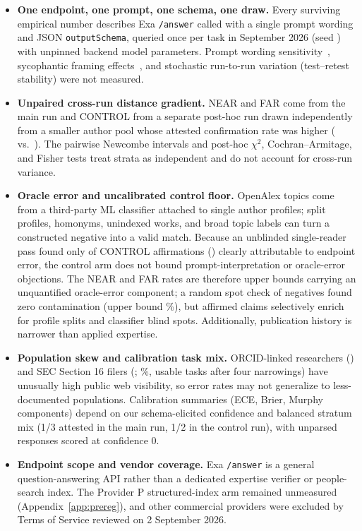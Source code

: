 \documentclass[11pt]{article}
\begin{document}
\begin{itemize}\setlength\itemsep{2pt}\setlength\parskip{0pt}
\item \textbf{One endpoint, one prompt, one schema, one draw.} Every surviving empirical number describes Exa \texttt{/answer} called with a single prompt wording and JSON \texttt{outputSchema}, queried once per task in September 2026 (seed \tiSeed{}) with unpinned backend model parameters. Prompt wording sensitivity~\citep{sclar2023prompt,mizrahi2023state}, sycophantic framing effects~\citep{sharma2023sycophancy}, and stochastic run-to-run variation (test--retest stability) were not measured.
\item \textbf{Unpaired cross-run distance gradient.} NEAR and FAR come from the main run and CONTROL from a separate post-hoc run drawn independently from a smaller author pool whose attested confirmation rate was higher (\tiCtlAttRate{} vs.\ \tiAttRate{}). The pairwise Newcombe intervals and post-hoc $\chi^2$, Cochran--Armitage, and Fisher tests treat strata as independent and do not account for cross-run variance.
\item \textbf{Oracle error and uncalibrated control floor.} OpenAlex topics come from a third-party ML classifier attached to single author profiles; split profiles, homonyms, unindexed works, and broad topic labels can turn a constructed negative into a valid match. Because an unblinded single-reader pass found only \tiRdOther{} of \tiCtlK{} CONTROL affirmations (\tiRdErrRate{}) clearly attributable to endpoint error, the control arm does not bound prompt-interpretation or oracle-error objections. The NEAR and FAR rates are therefore upper bounds carrying an unquantified oracle-error component; a random spot check of \tiSpotN{} negatives found zero contamination (upper bound \tiSpotHiPct{}\%), but affirmed claims selectively enrich for profile splits and classifier blind spots. Additionally, publication history is narrower than applied expertise.
\item \textbf{Population skew and calibration task mix.} ORCID-linked researchers (\tiAuthors{}) and SEC Section 16 filers (\tiCorpusPeople{}; \tiUsablePct{}\%, \tiUsableN{} usable tasks after four narrowings) have unusually high public web visibility, so error rates may not generalize to less-documented populations. Calibration summaries (ECE, Brier, Murphy components) depend on our schema-elicited confidence and balanced stratum mix (1/3 attested in the main run, 1/2 in the control run), with unparsed responses scored at confidence $0$.
\item \textbf{Endpoint scope and vendor coverage.} Exa \texttt{/answer} is a general question-answering API rather than a dedicated expertise verifier or people-search index. The Provider P structured-index arm remained unmeasured (Appendix~\ref{app:prereg}), and other commercial providers were excluded by Terms of Service reviewed on 2 September 2026.

\end{itemize}
\end{document}
